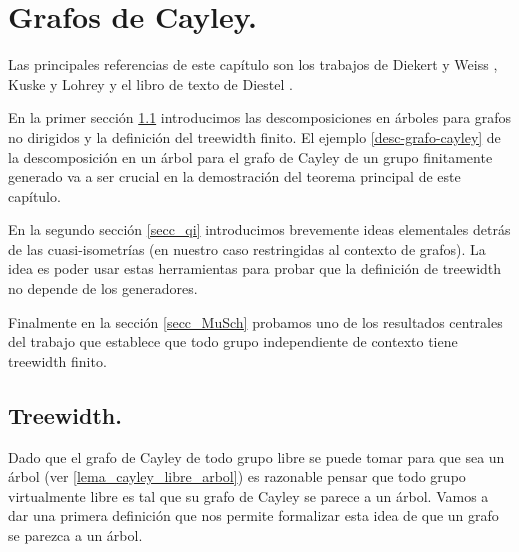 \documentclass[tesis.tex]{subfiles}
\begin{document}
	
\chapter{Grafos de Cayley.} \label{seccion_treewidth}

Las principales referencias de este capítulo son los trabajos de Diekert y Weiss \cite{diekert2017context}, Kuske y Lohrey \cite{kuske2005logical} y el libro de texto de Diestel \cite{diestel2005graph}.

En la primer sección \ref{secc_tw} introducimos las descomposiciones en árboles para grafos no dirigidos y la definición del treewidth finito.
El ejemplo \ref{desc-grafo-cayley} de la descomposición en un árbol para el grafo de Cayley de un grupo finitamente generado va a ser crucial en la demostración del teorema principal de este capítulo.


En la segundo sección \ref{secc_qi} introducimos brevemente ideas elementales detrás de las cuasi-isometrías (en nuestro caso restringidas al contexto de grafos).
La idea es poder usar estas herramientas para probar que la definición de treewidth no depende de los generadores.

Finalmente en la sección \ref{secc_MuSch} probamos uno de los resultados centrales del trabajo que establece que todo grupo independiente de contexto tiene treewidth finito.



\section{Treewidth.}\label{secc_tw}

Dado que el grafo de Cayley de todo grupo libre se puede tomar para que sea un árbol (ver \ref{lema_cayley_libre_arbol}) es razonable pensar que todo grupo virtualmente libre es tal que su grafo de Cayley se parece a un árbol. 
Vamos a dar una primera definición que nos permite formalizar esta idea de que un grafo se parezca a un árbol.
\end{document}
